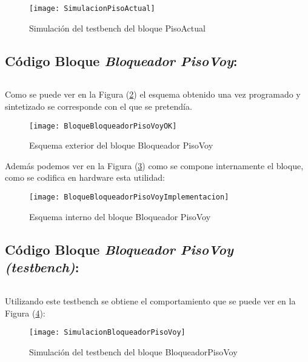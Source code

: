     \begin{figure}[H]
		    \centering
		    \texttt{[image: SimulacionPisoActual]}
		    \caption{Simulación del testbench del bloque PisoActual}
		    \label{fig:SimulacionPisoActual}
	\end{figure}


\subsection{Código Bloque \textit{Bloqueador PisoVoy}:} \label{code:BloqueadorpisoVoy}	
    \inputminted[frame=lines,fontsize=\footnotesize,linenos]{vhdl}{CodeFiles/BloqueadorPisoVoy.vhd}
	Como se puede ver en la Figura (\ref{fig:BloqueBloqueadorPisoVoyOK}) el esquema obtenido una vez programado y sintetizado se corresponde con el que se pretendía.
    \begin{figure}[H]
		    \centering
		    \texttt{[image: BloqueBloqueadorPisoVoyOK]}
		    \caption{Esquema exterior del bloque Bloqueador PisoVoy}
		    \label{fig:BloqueBloqueadorPisoVoyOK}
	\end{figure}
    Además podemos ver en la Figura (\ref{fig:BloqueBloqueadorPisoVoyImplementacion}) como se compone internamente el bloque, como se codifica en hardware esta utilidad:
    \begin{figure}[H]
		    \centering
		    \texttt{[image: BloqueBloqueadorPisoVoyImplementacion]}
		    \caption{Esquema interno del bloque Bloqueador PisoVoy}
		    \label{fig:BloqueBloqueadorPisoVoyImplementacion}
	\end{figure}

\subsection{Código Bloque \textit{Bloqueador PisoVoy (testbench)}:} \label{code:BloqueadorpisoVoy_tb}
    \inputminted[frame=lines,fontsize=\footnotesize,linenos]{vhdl}{CodeFiles/BloqueadorPisoVoy_tb.vhd}

    Utilizando este testbench se obtiene el comportamiento que se puede ver en la Figura (\ref{fig:SimulacionBloqueadorPisoVoy}):

    \begin{figure}[H]
		    \centering
		    \texttt{[image: SimulacionBloqueadorPisoVoy]}
		    \caption{Simulación del testbench del bloque BloqueadorPisoVoy}
		    \label{fig:SimulacionBloqueadorPisoVoy}
	\end{figure}

